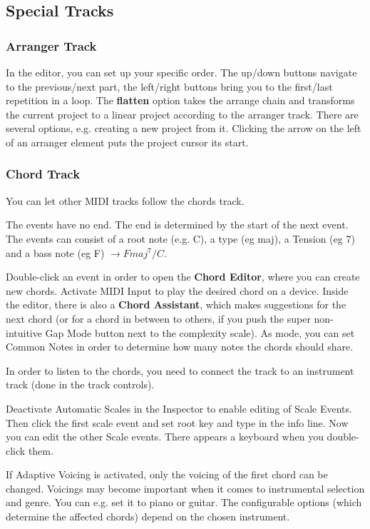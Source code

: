 \documentclass[10pt]{article}
\begin{document}
\subsection{Special Tracks}

\subsubsection{Arranger Track}

In the editor, you can set up your specific order. The up/down buttons navigate to the previous/next part, the left/right buttons bring you to the first/last repetition in a loop. The \textbf{flatten} option takes the arrange chain and transforms the current project to a linear project according to the arranger track. There are several options, e.g. creating a new project from it. Clicking the arrow on the left of an arranger element puts the project cursor its start.

\subsubsection{Chord Track}

You can let other MIDI tracks follow the chords track.

The events have no end. The end is determined by the start of the next event. The events can consist of a root note (e.g. C), a type (eg maj), a Tension (eg 7) and a bass note (eg F) $\rightarrow Fmaj^7/C$.

Double-click an event in order to open the \textbf{Chord Editor}, where you can create new chords. Activate MIDI Input to play the desired chord on a device. Inside the editor, there is also a \textbf{Chord Assistant}\hypertarget{ChordAssistant}{}, which makes suggestions for the next chord (or for a chord in between to others, if you push the super non-intuitive Gap Mode button next to the complexity scale). As mode, you can set Common Notes in order to determine how many notes the chords should share.

In order to listen to the chords, you need to connect the track to an instrument track (done in the track controls).

Deactivate Automatic Scales in the Inspector to enable editing of Scale Events. Then click the first scale event and set root key and type in the info line. Now you can edit the other Scale events. There appears a keyboard when you double-click them.

If Adaptive Voicing is activated, only the voicing of the first chord can be changed. Voicings may become important when it comes to instrumental selection and genre. You can e.g. set it to piano or guitar. The configurable options (which determine the affected chords) depend on the chosen instrument.
\end{document}
